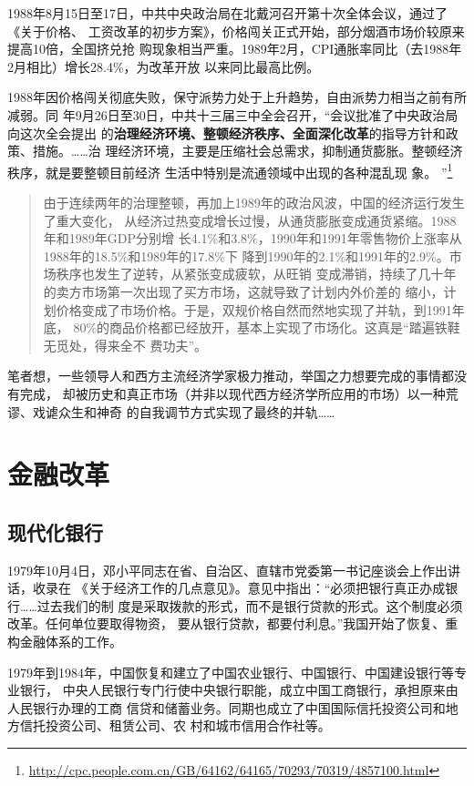 1988年8月15日至17日，中共中央政治局在北戴河召开第十次全体会议，通过了《关于价格、
工资改革的初步方案》，价格闯关正式开始，部分烟酒市场价较原来提高10倍，全国挤兑抢
购现象相当严重。1989年2月，CPI通胀率同比（去1988年2月相比）增长28.4\%，为改革开放
以来同比最高比例。

1988年因价格闯关彻底失败，保守派势力处于上升趋势，自由派势力相当之前有所减弱。同
年9月26日至30日，中共十三届三中全会召开，“会议批准了中央政治局向这次全会提出
的\textbf{治理经济环境、整顿经济秩序、全面深化改革}的指导方针和政策、措施。……治
理经济环境，主要是压缩社会总需求，抑制通货膨胀。整顿经济秩序，就是要整顿目前经济
生活中特别是流通领域中出现的各种混乱现
象。
”\footnote{\url{http://cpc.people.com.cn/GB/64162/64165/70293/70319/4857100.html}}

\begin{quotation}
  由于连续两年的治理整顿，再加上1989年的政治风波，中国的经济运行发生了重大变化，
  从经济过热变成增长过慢，从通货膨胀变成通货紧缩。1988年和1989年GDP分别增
  长4.1\%和3.8\%，1990年和1991年零售物价上涨率从1988年的18.5\%和1989年的17.8\%下
  降到1990年的2.1\%和1991年的2.9\%。市场秩序也发生了逆转，从紧张变成疲软，从旺销
  变成滞销，持续了几十年的卖方市场第一次出现了买方市场，这就导致了计划内外价差的
  缩小，计划价格变成了市场价格。于是，双规价格自然而然地实现了并轨，到1991年底，
  80\%的商品价格都已经放开，基本上实现了市场化。这真是“踏遍铁鞋无觅处，得来全不
  费功夫”。
\end{quotation}
笔者想，一些领导人和西方主流经济学家极力推动，举国之力想要完成的事情都没有完成，
却被历史和真正市场（并非以现代西方经济学所应用的市场）以一种荒谬、戏谑众生和神奇
的自我调节方式实现了最终的并轨……


\section{金融改革}
\label{sec:huilv78}

\subsection{现代化银行}

1979年10月4日，邓小平同志在省、自治区、直辖市党委第一书记座谈会上作出讲话，收录在
《关于经济工作的几点意见》。意见中指出：“必须把银行真正办成银行……过去我们的制
度是采取拨款的形式，而不是银行贷款的形式。这个制度必须改革。任何单位要取得物资，
要从银行贷款，都要付利息。”我国开始了恢复、重构金融体系的工作。

1979年到1984年，中国恢复和建立了中国农业银行、中国银行、中国建设银行等专业银行，
中央人民银行专门行使中央银行职能，成立中国工商银行，承担原来由人民银行办理的工商
信贷和储蓄业务。同期也成立了中国国际信托投资公司和地方信托投资公司、租赁公司、农
村和城市信用合作社等。

